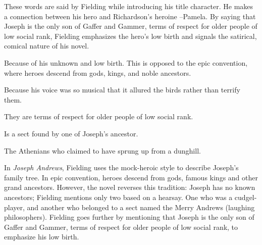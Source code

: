 \documentclass[12pt, a4paper]{article}
\begin{document}


These words are said by Fielding while introducing his title character.
He makes a connection between his hero and Richardson's heroine --Pamela.
By saying that Joseph is the only son of Gaffer and Gammer, terms of respect for
older people of low social rank, Fielding emphasizes the hero's low birth
and signals the satirical, comical nature of his novel.



Because of his unknown and low birth. This is opposed to the epic convention,
where heroes descend from gods, kings, and noble ancestors.


Because his voice was so musical that it allured the birds rather than terrify them.


They are terms of respect for older people of low social rank.


Is a sect found by one of Joseph's ancestor.


The Athenians who claimed to have sprung up from a dunghill.
\enlargethispage{\baselineskip}


In \textit{Joseph Andrews}, Fielding uses the mock-heroic style to describe Joseph's
family tree. In epic convention, heroes descend from gods, famous 
kings and other grand ancestors. However, the novel reverses this tradition: 
Joseph has no known ancestors; Fielding mentions only two based on a hearsay.
One who was a cudgel-player, and another who belonged to a sect named the Merry Andrews 
(laughing philosophers). Fielding goes further 
by mentioning that Joseph is the only son of Gaffer and Gammer,
terms of respect for older people of low social rank, to 
emphasize his low birth.
\end{document}
